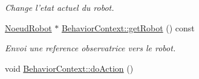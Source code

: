 \begin{DoxyCompactItemize}
\begin{DoxyCompactList}\small\item\em Change l'etat actuel du robot. \end{DoxyCompactList}\item 
\hypertarget{group__inf2990_gab248d4182058e0746819e567d9fecbfb}{\hyperlink{class_noeud_robot}{Noeud\-Robot} $\ast$ \hyperlink{group__inf2990_gab248d4182058e0746819e567d9fecbfb}{Behavior\-Context\-::get\-Robot} () const }\label{group__inf2990_gab248d4182058e0746819e567d9fecbfb}

\begin{DoxyCompactList}\small\item\em Envoi une reference observatrice vers le robot. \end{DoxyCompactList}\item 
\hypertarget{group__inf2990_ga2d15f4d9b398d9b3cb79f790dcf0187f}{void \hyperlink{group__inf2990_ga2d15f4d9b398d9b3cb79f790dcf0187f}{Behavior\-Context\-::do\-Action} ()}\label{group__inf2990_ga2d15f4d9b398d9b3cb79f790dcf0187f}


\end{DoxyCompactItemize}
